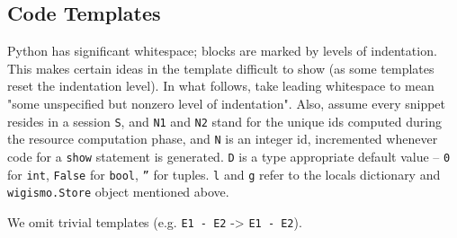 \documentclass{WigReport}
\begin{document}
\subsection{Code Templates}
Python has significant whitespace; blocks are marked by levels of
indentation. This makes certain ideas in the template difficult to show
(as some templates reset the indentation level). In what follows, take
leading whitespace to mean "some unspecified but nonzero level of
indentation". Also, assume every snippet resides in a session {\tt S},
and {\tt N1} and {\tt N2} stand for the unique ids computed during the
resource computation phase, and {\tt N} is an integer id, incremented
whenever code for a {\tt show} statement is generated. {\tt D} is a type
appropriate default value -- {\tt 0} for {\tt int}, {\tt False} for
{\tt bool}, {\tt ''} for tuples. {\tt l} and {\tt g} refer to the locals
dictionary and {\tt wigismo.Store} object mentioned above.

We omit trivial templates (e.g. {\tt E1 - E2} -> {\tt E1 - E2}).
\end{document}
